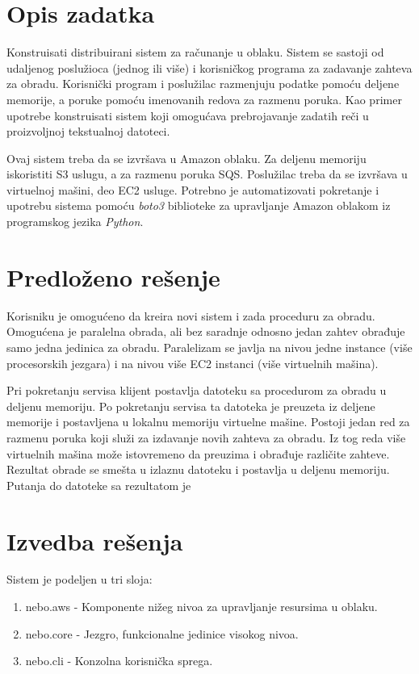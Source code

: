 \documentclass[a4paper]{article}
\begin{document}
\section{Opis zadatka}

Konstruisati distribuirani sistem za računanje u oblaku. Sistem se sastoji od
udaljenog poslužioca (jednog ili više) i korisničkog programa za zadavanje
zahteva za obradu. Korisnički program i poslužilac razmenjuju podatke pomoću
deljene memorije, a poruke pomoću imenovanih redova za razmenu poruka. Kao
primer upotrebe konstruisati sistem koji omogućava prebrojavanje zadatih reči u
proizvoljnoj tekstualnoj datoteci.

Ovaj sistem treba da se izvršava u Amazon oblaku. Za deljenu memoriju
iskoristiti S3 uslugu, a za razmenu poruka SQS. Poslužilac treba da se izvršava
u virtuelnoj mašini, deo EC2 usluge. Potrebno je automatizovati pokretanje i
upotrebu sistema pomoću {\em boto3} biblioteke za upravljanje Amazon oblakom iz
programskog jezika \mbox{\em Python}.

\section{Predloženo rešenje}

Korisniku je omogućeno da kreira novi sistem i zada proceduru za obradu.
Omogućena je paralelna obrada, ali bez saradnje odnosno jedan zahtev obrađuje
samo jedna jedinica za obradu. Paralelizam se javlja na nivou jedne instance
(više procesorskih jezgara) i na nivou više EC2 instanci (više virtuelnih
mašina).

Pri pokretanju servisa klijent postavlja datoteku sa procedurom za obradu u
deljenu memoriju. Po pokretanju servisa ta datoteka je preuzeta iz deljene
memorije i postavljena u lokalnu memoriju virtuelne mašine. Postoji jedan red za
razmenu poruka koji služi za izdavanje novih zahteva za obradu. Iz tog reda više
virtuelnih mašina može istovremeno da preuzima i obrađuje različite zahteve.
Rezultat obrade se smešta u izlaznu datoteku i postavlja u deljenu memoriju.
Putanja do datoteke sa rezultatom je 

\section{Izvedba rešenja}

Sistem je podeljen u tri sloja:

\begin{enumerate}
  \item nebo.aws - Komponente nižeg nivoa za upravljanje resursima u oblaku.
  \item nebo.core - Jezgro, funkcionalne jedinice visokog nivoa.
  \item nebo.cli - Konzolna korisnička sprega.
\end{enumerate}
\end{document}
